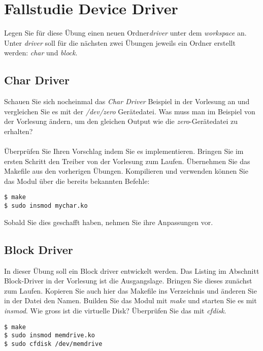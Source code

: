 \section{Fallstudie Device Driver}

Legen Sie für diese Übung einen neuen Ordner\emph{driver} unter dem \emph{workspace} an.
Unter \emph{driver} soll für die nächsten zwei Übungen jeweils ein Ordner erstellt werden:
\emph{char} und \emph{block}.

\subsection{Char Driver}

Schauen Sie sich nocheinmal das \emph{Char Driver} Beispiel in der Vorlesung an und vergleichen Sie es mit der
\emph{/dev/zero} Gerätedatei. Was muss man im Beispiel von der Vorlesung ändern, um den gleichen Output wie die
\emph{zero}-Gerätedatei zu erhalten? \\

\underline{\hspace{\textwidth}} \\

Überprüfen Sie Ihren Vorschlag indem Sie es implementieren. Bringen Sie im ersten Schritt den Treiber von der Vorlesung
zum Laufen. Übernehmen Sie das Makefile aus den vorherigen Übungen. Kompilieren und verwenden können Sie das Modul über die bereits
bekannten Befehle:
\begin{lstlisting}
$ make
$ sudo insmod mychar.ko
\end{lstlisting}

Sobald Sie dies geschafft haben, nehmen Sie ihre Anpassungen vor.

\subsection{Block Driver}

In dieser Übung soll ein Block driver entwickelt werden. Das Listing im Abschnitt Block-Driver in der Vorlesung ist die Ausgangslage. Bringen Sie
dieses zunächst zum Laufen.
Kopieren Sie auch hier das Makefile ins Verzeichnis und änderen Sie in der Datei den Namen. Builden Sie das Modul
mit \emph{make} und starten Sie es mit \emph{insmod}. Wie gross ist die virtuelle Disk? Überprüfen Sie das mit \emph{cfdisk}.

\begin{lstlisting}
$ make
$ sudo insmod memdrive.ko
$ sudo cfdisk /dev/memdrive
\end{lstlisting}

